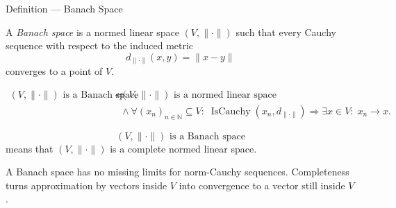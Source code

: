 \begin{definitionbox}{Definition --- Banach Space}
\begin{definition}\label{def:banach-space}
A \emph{Banach space} is a normed linear space \((V,\|\cdot\|)\) such that
every Cauchy sequence with respect to the induced metric
\[
  d_{\|\cdot\|}(x,y)=\|x-y\|
\]
converges to a point of \(V\).
\end{definition}
\end{definitionbox}

\begin{remark*}
\[
\begin{aligned}
\text{\((V,\|\cdot\|)\) is a Banach space}
\Longleftrightarrow\;&
\text{\((V,\|\cdot\|)\) is a normed linear space}
\\
&{}\land
\forall (x_n)_{n\in\mathbb{N}}\subseteq V{:}\;
\operatorname{IsCauchy}(x_n,d_{\|\cdot\|})
\Longrightarrow
\exists x\in V{:}\;x_n\to x.
\end{aligned}
\]
\end{remark*}

\begin{remark*}
\[
\text{\((V,\|\cdot\|)\) is a Banach space}
\]
means that \((V,\|\cdot\|)\) is a complete normed linear space.
\end{remark*}

\begin{remark*}[Interpretation]
A Banach space has no missing limits for norm-Cauchy sequences.  Completeness
turns approximation by vectors inside \(V\) into convergence to a vector still
inside \(V\).
\end{remark*}

\DefinitionalRoot
